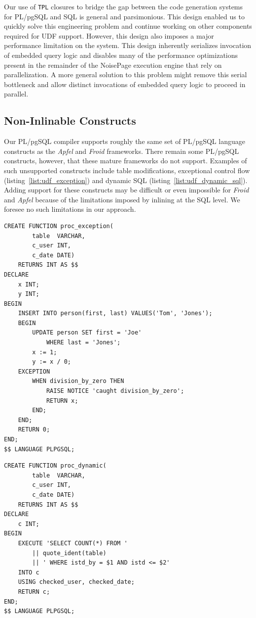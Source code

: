 \documentclass{vldb}
\newcommand{\tpl}{\texttt{TPL}\xspace}
\newcommand{\plpgsql}{PL/pgSQL\xspace}
\begin{document}
Our use of \tpl closures to bridge the gap between the code generation systems for \plpgsql and SQL is general and parsimonious. This design enabled us to quickly solve this engineering problem and continue working on other components required for UDF support. However, this design also imposes a major performance limitation on the system. This design inherently serializes invocation of embedded query logic and disables many of the performance optimizations present in the remainder of the NoisePage execution engine that rely on parallelization. A more general solution to this problem might remove this serial bottleneck and allow distinct invocations of embedded query logic to proceed in parallel.

\subsection{Non-Inlinable Constructs}

Our \plpgsql compiler supports roughly the same set of \plpgsql language constructs as the \textit{Apfel} and \textit{Froid} frameworks. There remain some \plpgsql constructs, however, that these mature frameworks do not support. Examples of such unsupported constructs include table modifications, exceptional control flow (listing~\ref{list:udf_exception}) and dynamic SQL (listing~\ref{list:udf_dynamic_sql}). Adding support for these constructs may be difficult or even impossible for \textit{Froid} and \textit{Apfel} because of the limitations imposed by inlining at the SQL level. We foresee no such limitations in our approach.

\begin{listing}
    \begin{verbatim}
CREATE FUNCTION proc_exception(
        table  VARCHAR, 
        c_user INT, 
        c_date DATE) 
    RETURNS INT AS $$
DECLARE
    x INT;
    y INT;
BEGIN
    INSERT INTO person(first, last) VALUES('Tom', 'Jones');
    BEGIN
        UPDATE person SET first = 'Joe' 
            WHERE last = 'Jones';
        x := 1;
        y := x / 0;
    EXCEPTION
        WHEN division_by_zero THEN
            RAISE NOTICE 'caught division_by_zero';
            RETURN x;
        END;
    END;
    RETURN 0;
END;
$$ LANGUAGE PLPGSQL;
    \end{verbatim}
    \caption{An example of a UDF containing exceptional control flow.}
    \label{list:udf_exception}
\end{listing}

\begin{listing}
    \begin{verbatim}
CREATE FUNCTION proc_dynamic(
        table  VARCHAR, 
        c_user INT, 
        c_date DATE) 
    RETURNS INT AS $$
DECLARE
    c INT;
BEGIN
    EXECUTE 'SELECT COUNT(*) FROM '
        || quote_ident(table)
        || ' WHERE istd_by = $1 AND istd <= $2'
    INTO c
    USING checked_user, checked_date;
    RETURN c;
END; 
$$ LANGUAGE PLPGSQL;
    \end{verbatim}
    \caption{An example of a UDF containing dynamic SQL.}
    \label{list:udf_dynamic_sql}
\end{listing}
\end{document}
